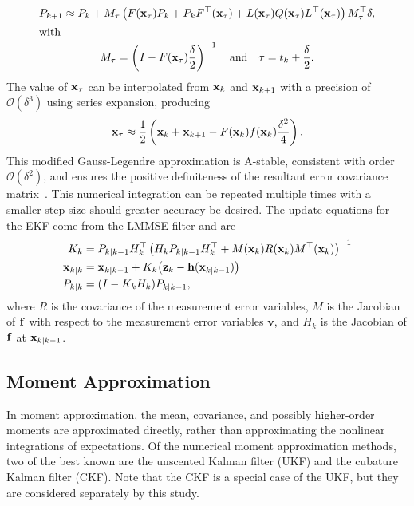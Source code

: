 \documentclass[../zhang_thesis.tex]{subfiles}
\begin{document}
\begin{gather}
    P_{k+1} \approx P_k + M_\tau \left( F(\mathbf{x}_\tau) P_k + P_k F^\top(\mathbf{x}_\tau) + L(\mathbf{x}_\tau) Q(\mathbf{x}_\tau) L^\top(\mathbf{x}_\tau) \right) M_\tau^\top \delta, \\
    \intertext{with}
    M_\tau = \left( I - F(\mathbf{x}_\tau) \frac{\delta}{2} \right)^{-1} \quad \text{and} \quad \tau = t_k + \frac{\delta}{2}.
\end{gather}
The value of $\mathbf{x}_\tau$ can be interpolated from $\mathbf{x}_k$ and $\mathbf{x}_{k+1}$ with a precision of $\mathcal{O}(\delta^3)$ using series expansion, producing
\begin{equation}
    \mathbf{x}_\tau \approx \frac{1}{2} \left( \mathbf{x}_k + \mathbf{x}_{k+1} - F(\mathbf{x}_k) f(\mathbf{x}_k) \frac{\delta^2}{4} \right).
\end{equation}
This modified Gauss-Legendre approximation is A-stable, consistent with order $\mathcal{O}(\delta^2)$, and ensures the positive definiteness of the resultant error covariance matrix~\cite{mazzoni07}. This numerical integration can be repeated multiple times with a smaller step size should greater accuracy be desired. The update equations for the EKF come from the LMMSE filter and are
\begin{align}
    K_k &= P_{k|k-1} H_k^\top \left( H_k P_{k|k-1} H_k^\top + M(\mathbf{x}_k) R(\mathbf{x}_k) M^\top(\mathbf{x}_k) \right)^{-1} \\
    \mathbf{x}_{k|k} &= \mathbf{x}_{k|k-1} + K_k \big( \mathbf{z}_k - \mathbf{h}(\mathbf{x}_{k|k-1}) \big) \\
    P_{k|k} &= (I - K_k H_k) P_{k|k-1},
\end{align}
where $R$ is the covariance of the measurement error variables, $M$ is the Jacobian of $\mathbf{f}$ with respect to the measurement error variables $\mathbf{v}$, and $H_k$ is the Jacobian of $\mathbf{f}$ at $\mathbf{x}_{k|k-1}$.

\subsection{Moment Approximation}

In moment approximation, the mean, covariance, and possibly higher-order moments are approximated directly, rather than approximating the nonlinear integrations of expectations. Of the numerical moment approximation methods, two of the best known are the unscented Kalman filter (UKF) and the cubature Kalman filter (CKF). Note that the CKF is a special case of the UKF, but they are considered separately by this study.
\end{document}
